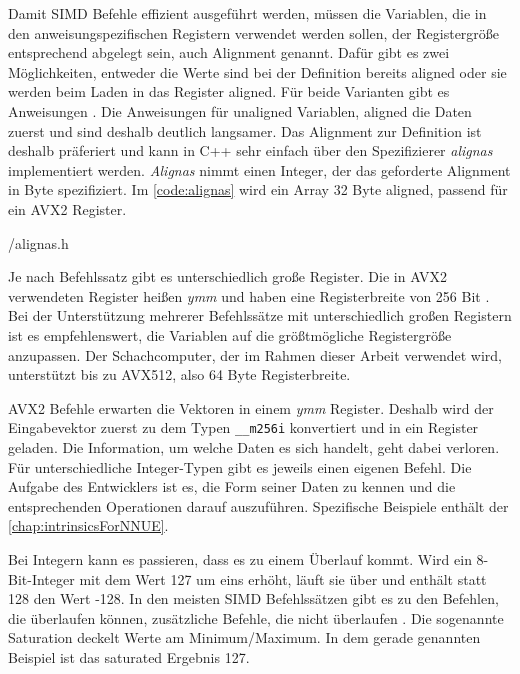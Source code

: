 Damit \ac{SIMD} Befehle effizient ausgeführt werden, müssen die Variablen, die in den anweisungspezifischen Registern verwendet werden sollen, der Registergröße entsprechend abgelegt sein, auch Alignment genannt. Dafür gibt es zwei Möglichkeiten, entweder die Werte sind bei der Definition bereits aligned oder sie werden beim Laden in das Register aligned. Für beide Varianten gibt es Anweisungen \cite{intelIntrinsics}. Die Anweisungen für unaligned Variablen, aligned die Daten zuerst und sind deshalb deutlich langsamer. Das Alignment zur Definition ist deshalb präferiert und kann in C++ sehr einfach über den Spezifizierer \emph{alignas} implementiert werden. \emph{Alignas} nimmt einen Integer, der das geforderte Alignment in Byte spezifiziert. Im \autoref{code:alignas} wird ein Array 32 Byte aligned, passend für ein \ac{AVX2} Register.


{\srcloc/alignas.h}

Je nach Befehlssatz gibt es unterschiedlich große Register. Die in \ac{AVX2} verwendeten Register heißen \emph{ymm} und haben eine Registerbreite von 256 Bit \cite{intelIntrinsics}. Bei der Unterstützung mehrerer Befehlssätze mit unterschiedlich großen Registern ist es empfehlenswert, die Variablen auf die größtmögliche Registergröße anzupassen. Der Schachcomputer, der im Rahmen dieser Arbeit verwendet wird, unterstützt bis zu \ac{AVX512}, also 64 Byte Registerbreite.

\ac{AVX2} Befehle erwarten die Vektoren in einem \emph{ymm} Register. Deshalb wird der Eingabevektor zuerst zu dem Typen \lstinline[language=C++]{__m256i} konvertiert und in ein Register geladen. Die Information, um welche Daten es sich handelt, geht dabei verloren. Für unterschiedliche Integer-Typen gibt es jeweils einen eigenen Befehl. Die Aufgabe des Entwicklers ist es, die Form seiner Daten zu kennen und die entsprechenden Operationen darauf auszuführen. Spezifische Beispiele enthält der \autoref{chap:intrinsicsForNNUE}.

Bei Integern kann es passieren, dass es zu einem Überlauf kommt. Wird ein 8-Bit-Integer mit dem Wert 127 um eins erhöht, läuft sie über und enthält statt 128 den Wert -128. In den meisten \ac{SIMD} Befehlssätzen gibt es zu den Befehlen, die überlaufen können, zusätzliche Befehle, die nicht überlaufen \cite{intelIntrinsics}. Die sogenannte Saturation deckelt Werte am Minimum/Maximum. In dem gerade genannten Beispiel ist das saturated Ergebnis 127.

